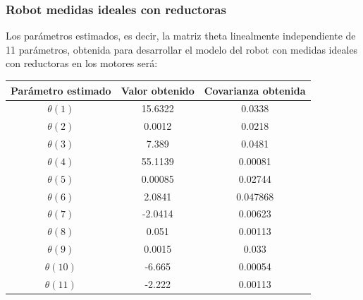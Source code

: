 \subsubsection{Robot medidas ideales con reductoras}

Los parámetros estimados, es decir, la matriz theta linealmente independiente de 11 parámetros, obtenida para desarrollar el modelo del robot con medidas ideales con reductoras en los motores será:

\begin{center}
	
	\begin{tabular}{| c | c | c |}
		
		
		
		\hline
		
		Parámetro estimado & Valor obtenido & Covarianza obtenida \\
		
		\hline
		
		$\theta(1) $ & 15.6322 & 0.0338 \\
		
		\hline
		
		$\theta(2) $ & 0.0012 & 0.0218 \\
		
		\hline
		
		$\theta(3) $ & 7.389 & 0.0481 \\
		
		\hline
		
		$\theta(4) $ & 55.1139 & 0.00081 \\
		
		\hline
		
		$\theta(5) $ & 0.00085 & 0.02744 \\
		
		\hline
		
		$\theta(6) $ & 2.0841 & 0.047868 \\
		
		\hline
		
		$\theta(7) $ & -2.0414 & 0.00623 \\
		
		\hline
		
		$\theta(8) $ & 0.051 & 0.00113 \\
		
		\hline
		
		$\theta(9) $ & 0.0015 & 0.033 \\
		
		\hline
		
		$\theta(10) $ & -6.665 & 0.00054 \\
		
		\hline
		
		$\theta(11) $ & -2.222 & 0.00113 \\
		
		\hline
		
		
		
		
		
	\end{tabular}
	
\end{center}

